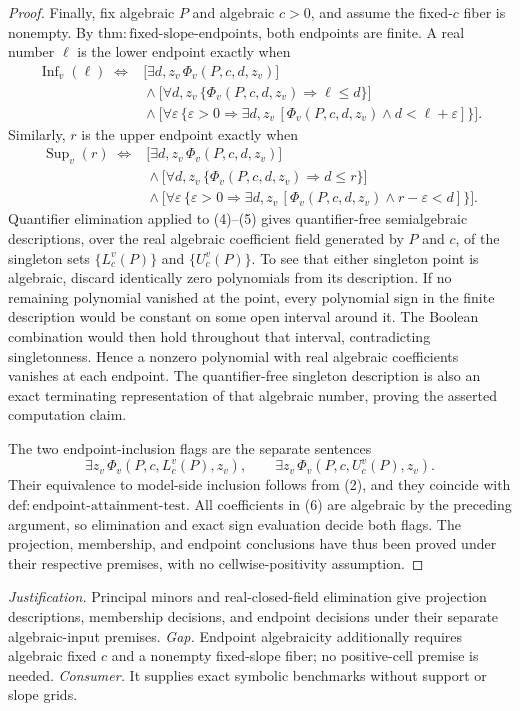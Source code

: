 \documentclass{article}
\begin{document}
\begin{proof}
Finally, fix algebraic \(P\) and algebraic \(c>0\), and assume the fixed-\(c\) fiber is nonempty.  By \(\mathrm{thm{:}fixed\text{-}slope\text{-}endpoints}\), both endpoints are finite.  A real number \(\ell\) is the lower endpoint exactly when
\[
\begin{aligned}
 \operatorname{Inf}_v(\ell)\;\Longleftrightarrow{}&
 \bigl[\exists d,z_v\,\Phi_v(P,c,d,z_v)\bigr]\\
 &{}\wedge\bigl[\forall d,z_v\,
   \{\Phi_v(P,c,d,z_v)\Rightarrow \ell\le d\}\bigr]\\
 &{}\wedge\bigl[\forall\varepsilon\,
   \{\varepsilon>0\Rightarrow
   \exists d,z_v\,[\Phi_v(P,c,d,z_v)\wedge d<\ell+\varepsilon]\}\bigr].
\end{aligned} \tag{4}
\]
Similarly, \(r\) is the upper endpoint exactly when
\[
\begin{aligned}
 \operatorname{Sup}_v(r)\;\Longleftrightarrow{}&
 \bigl[\exists d,z_v\,\Phi_v(P,c,d,z_v)\bigr]\\
 &{}\wedge\bigl[\forall d,z_v\,
   \{\Phi_v(P,c,d,z_v)\Rightarrow d\le r\}\bigr]\\
 &{}\wedge\bigl[\forall\varepsilon\,
   \{\varepsilon>0\Rightarrow
   \exists d,z_v\,[\Phi_v(P,c,d,z_v)\wedge r-\varepsilon<d]\}\bigr].
\end{aligned} \tag{5}
\]
Quantifier elimination applied to (4)--(5) gives quantifier-free semialgebraic descriptions, over the real algebraic coefficient field generated by \(P\) and \(c\), of the singleton sets \(\{L_c^v(P)\}\) and \(\{U_c^v(P)\}\).  To see that either singleton point is algebraic, discard identically zero polynomials from its description.  If no remaining polynomial vanished at the point, every polynomial sign in the finite description would be constant on some open interval around it.  The Boolean combination would then hold throughout that interval, contradicting singletonness.  Hence a nonzero polynomial with real algebraic coefficients vanishes at each endpoint.  The quantifier-free singleton description is also an exact terminating representation of that algebraic number, proving the asserted computation claim.

The two endpoint-inclusion flags are the separate sentences
\[
 \exists z_v\,\Phi_v(P,c,L_c^v(P),z_v),
 \qquad
 \exists z_v\,\Phi_v(P,c,U_c^v(P),z_v). \tag{6}
\]
Their equivalence to model-side inclusion follows from (2), and they coincide with \(\mathrm{def{:}endpoint\text{-}attainment\text{-}test}\).  All coefficients in (6) are algebraic by the preceding argument, so elimination and exact sign evaluation decide both flags.  The projection, membership, and endpoint conclusions have thus been proved under their respective premises, with no cellwise-positivity assumption.
\end{proof}
\par\smallskip\noindent \textit{Justification.} Principal minors and real-closed-field elimination give projection descriptions, membership decisions, and endpoint decisions under their separate algebraic-input premises. \textit{Gap.} Endpoint algebraicity additionally requires algebraic fixed \(c\) and a nonempty fixed-slope fiber; no positive-cell premise is needed. \textit{Consumer.} It supplies exact symbolic benchmarks without support or slope grids.
\end{document}
